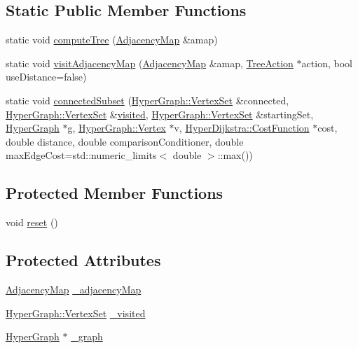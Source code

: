 \subsection*{Static Public Member Functions}
\begin{DoxyCompactItemize}
\item 
static void \hyperlink{structg2o_1_1HyperDijkstra_a84a1d7288e1d76369442f89604c5d6de}{compute\+Tree} (\hyperlink{structg2o_1_1HyperDijkstra_af12ff8eef95094815a3fa1da0514bda2}{Adjacency\+Map} \&amap)
\item 
static void \hyperlink{structg2o_1_1HyperDijkstra_aa73ae495f10f81823b16f26715f32c58}{visit\+Adjacency\+Map} (\hyperlink{structg2o_1_1HyperDijkstra_af12ff8eef95094815a3fa1da0514bda2}{Adjacency\+Map} \&amap, \hyperlink{structg2o_1_1HyperDijkstra_1_1TreeAction}{Tree\+Action} $\ast$action, bool use\+Distance=false)
\item 
static void \hyperlink{structg2o_1_1HyperDijkstra_a846232e98c8175ec2fff784fc3271ad7}{connected\+Subset} (\hyperlink{classg2o_1_1HyperGraph_a703938cdb4bb636860eed55a2489d70c}{Hyper\+Graph\+::\+Vertex\+Set} \&connected, \hyperlink{classg2o_1_1HyperGraph_a703938cdb4bb636860eed55a2489d70c}{Hyper\+Graph\+::\+Vertex\+Set} \&\hyperlink{structg2o_1_1HyperDijkstra_a2cb453ed6f1bf6069186bd269a6464da}{visited}, \hyperlink{classg2o_1_1HyperGraph_a703938cdb4bb636860eed55a2489d70c}{Hyper\+Graph\+::\+Vertex\+Set} \&starting\+Set, \hyperlink{classg2o_1_1HyperGraph}{Hyper\+Graph} $\ast$g, \hyperlink{classg2o_1_1HyperGraph_1_1Vertex}{Hyper\+Graph\+::\+Vertex} $\ast$v, \hyperlink{structg2o_1_1HyperDijkstra_1_1CostFunction}{Hyper\+Dijkstra\+::\+Cost\+Function} $\ast$cost, double distance, double comparison\+Conditioner, double max\+Edge\+Cost=std\+::numeric\+\_\+limits$<$ double $>$\+::max())
\end{DoxyCompactItemize}
\subsection*{Protected Member Functions}
\begin{DoxyCompactItemize}
\item 
void \hyperlink{structg2o_1_1HyperDijkstra_ad9c39fd01a0740f2beff98c927aaebbd}{reset} ()
\end{DoxyCompactItemize}
\subsection*{Protected Attributes}
\begin{DoxyCompactItemize}
\item 
\hyperlink{structg2o_1_1HyperDijkstra_af12ff8eef95094815a3fa1da0514bda2}{Adjacency\+Map} \hyperlink{structg2o_1_1HyperDijkstra_ae306dd26e901b88fe6c54f02a45c3e7f}{\+\_\+adjacency\+Map}
\item 
\hyperlink{classg2o_1_1HyperGraph_a703938cdb4bb636860eed55a2489d70c}{Hyper\+Graph\+::\+Vertex\+Set} \hyperlink{structg2o_1_1HyperDijkstra_ad43cae6d9e1df2cf7db839f504ba6cc5}{\+\_\+visited}
\item 
\hyperlink{classg2o_1_1HyperGraph}{Hyper\+Graph} $\ast$ \hyperlink{structg2o_1_1HyperDijkstra_a1bf21d65ddd6e0feeb6a76f58d7f2c6e}{\+\_\+graph}
\end{DoxyCompactItemize}


